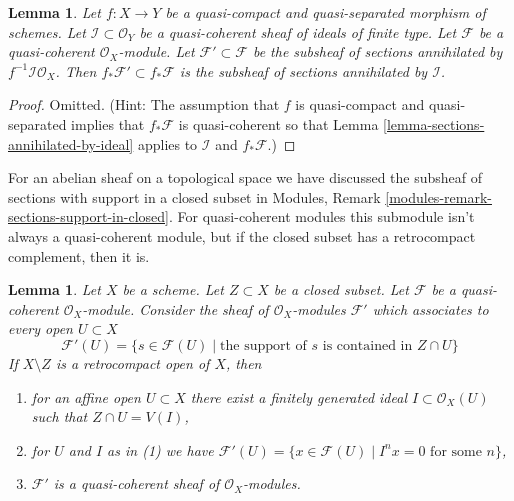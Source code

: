 \documentclass{stacks-project}
\theoremstyle{plain}
\newtheorem{lemma}[subsection]{Lemma}
\theoremstyle{definition}
\theoremstyle{remark}
\numberwithin{equation}{subsection}
\begin{document}
\begin{lemma}
\label{lemma-push-sections-annihilated-by-ideal}
Let $f : X \to Y$ be a quasi-compact and quasi-separated morphism
of schemes. Let $\mathcal{I} \subset \mathcal{O}_Y$ be a quasi-coherent
sheaf of ideals of finite type. Let $\mathcal{F}$ be a quasi-coherent
$\mathcal{O}_X$-module. Let $\mathcal{F}' \subset \mathcal{F}$
be the subsheaf of sections annihilated by $f^{-1}\mathcal{I}\mathcal{O}_X$.
Then $f_*\mathcal{F}' \subset f_*\mathcal{F}$ is the subsheaf
of sections annihilated by $\mathcal{I}$.
\end{lemma}

\begin{proof}
Omitted. (Hint: The assumption that $f$ is quasi-compact and
quasi-separated implies that $f_*\mathcal{F}$ is quasi-coherent
so that Lemma \ref{lemma-sections-annihilated-by-ideal} applies
to $\mathcal{I}$ and $f_*\mathcal{F}$.)
\end{proof}

\noindent
For an abelian sheaf on a topological space we have discussed the subsheaf
of sections with support in a closed subset in
Modules, Remark \ref{modules-remark-sections-support-in-closed}.
For quasi-coherent modules this submodule isn't always a quasi-coherent
module, but if the closed subset has a retrocompact complement, then
it is.

\begin{lemma}
\label{lemma-sections-supported-on-closed-subset}
Let $X$ be a scheme. Let $Z \subset X$ be a closed subset.
Let $\mathcal{F}$ be a quasi-coherent $\mathcal{O}_X$-module.
Consider the sheaf of $\mathcal{O}_X$-modules $\mathcal{F}'$
which associates to every open $U \subset X$
$$
\mathcal{F}'(U)
=
\{s \in \mathcal{F}(U) \mid
\text{the support of }s\text{ is contained in }Z \cap U\}
$$
If $X \setminus Z$ is a retrocompact open of $X$, then
\begin{enumerate}
\item for an affine open $U \subset X$ there exist a finitely generated
ideal $I \subset \mathcal{O}_X(U)$ such that $Z \cap U = V(I)$,
\item for $U$ and $I$ as in (1) we have
$\mathcal{F}'(U) = \{x \in \mathcal{F}(U) \mid
I^nx = 0 \text{ for some } n\}$,
\item $\mathcal{F}'$ is a quasi-coherent sheaf of $\mathcal{O}_X$-modules.
\end{enumerate}
\end{lemma}
\end{document}
